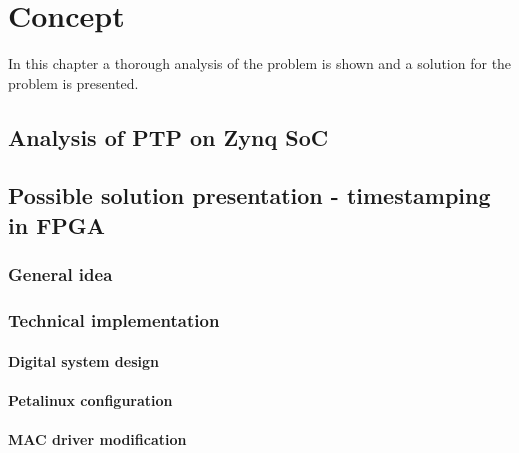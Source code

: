 \chapter{Concept}
In this chapter a thorough analysis of the problem is shown and a solution for the problem is presented. 

\section{Analysis of PTP on Zynq SoC}
\section{Possible solution presentation - timestamping in FPGA}
\subsection{General idea}
\subsection{Technical implementation}
\subsubsection{Digital system design}
\subsubsection{Petalinux configuration}
\subsubsection{MAC driver modification}
